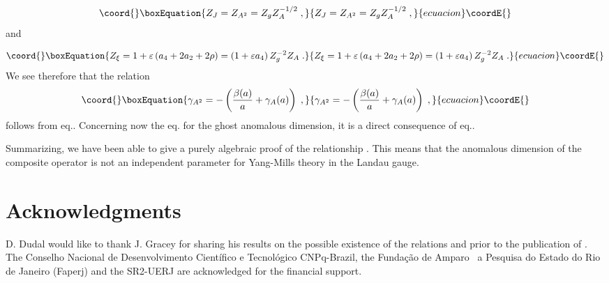 \documentclass[a4paper,12pt]{article}
\begin{document}
\begin{equation}\coord{}\boxEquation{
Z_{J}=Z_{A^{2}}=Z_{g}Z_{A}^{-1/2}\;,  \label{zj}
}{
Z_{J}=Z_{A^{2}}=Z_{g}Z_{A}^{-1/2}\;,  }{ecuacion}\coordE{}\end{equation}
and

\begin{equation}\coord{}\boxEquation{
Z_{\xi }=1+\varepsilon \left( a_{4}+2a_{2}+2\rho \right) =\left(
1+\varepsilon a_{4}\right) Z_{g}^{-2}Z_{A}\;.  \label{zx}
}{
Z_{\xi }=1+\varepsilon \left( a_{4}+2a_{2}+2\rho \right) =\left(
1+\varepsilon a_{4}\right) Z_{g}^{-2}Z_{A}\;.  }{ecuacion}\coordE{}\end{equation}
We see therefore that the relation 
\begin{equation}\coord{}\boxEquation{
\gamma _{A^{2}}=-\left( \frac{\beta (a)}{a}+\gamma _{A}(a)\right) \;,
\label{frel}
}{
\gamma _{A^{2}}=-\left( \frac{\beta (a)}{a}+\gamma _{A}(a)\right) \;,
}{ecuacion}\coordE{}\end{equation}
follows from eq.\myHighlight{$\left( \ref{zj}\right) $}\coordHE{}. Concerning now the eq.\myHighlight{$\left( \ref
{rel}\right) $}\coordHE{} for the ghost anomalous dimension, it is a direct consequence
of eq.\myHighlight{$\left( \ref{zc}\right) $}\coordHE{}.

Summarizing, we have been able to give a purely algebraic proof of the
relationship \myHighlight{$\left( \ref{ga2}\right) $}\coordHE{}. This means that the anomalous
dimension \coordHE{} of the composite operator \coordHE{}is not an independent parameter for Yang-Mills theory in the Landau
gauge.

\section{Acknowledgments}

D. Dudal would like to thank J. Gracey for sharing his results on the
possible existence of the relations \myHighlight{$\left( \ref{ri}\right) $}\coordHE{} and \myHighlight{$\left( 
\ref{ri1}\right) $}\coordHE{} prior to the publication of \cite{gr}. The Conselho
Nacional de Desenvolvimento Cient\'{i}fico e Tecnol\'{o}gico CNPq-Brazil,
the Funda{\c{c}}{\~{a}}o de Amparo {\ a Pesquisa do Estado do Rio de Janeiro
(Faperj) and the SR2-UERJ are acknowledged for the financial support. }
\end{document}
